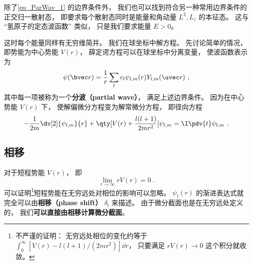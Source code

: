 除了\autoref{eq_ParWav_1} 的边界条件外， 我们也可以找到符合另一种常用边界条件的正交归一散射态， 即要求每个散射态同时是能量和角动量 $L^2, L_z$ 的本征态。 这与 “氢原子的定态波函数” 类似， 只是我们要求能量 $E > 0$。

这时每个能量同样有无穷维简并。 我们在球坐标中解方程。 先讨论简单的情况， 即势能为中心势能 $V(r)$， 薛定谔方程可以在球坐标中分离变量， 使波函数表示为 %
\begin{equation}
\psi(\bvec r) = \frac{1}{r} \sum_l c_l \psi_{l,m}(r) Y_{l,m}(\uvec r)~,
\end{equation}
其中每一项被称为一个\textbf{分波（partial wave）}， 满足上述边界条件。 因为在中心势能 $V(r)$ 下， 使解偏微分方程变为解常微分方程， 即径向方程 %
\begin{equation}
-\frac{1}{2m} \dv[2]{\psi_{l,m}}{r} + \qty[V(r) + \frac{l(l + 1)}{2mr^2}]\psi_{l,m} = \I \pdv{t} \psi_{l,m}~.
\end{equation}

\subsection{相移}
对于短程势能 $V(r)$， 即
\begin{equation}
\lim_{r\to\infty} r V(r) = 0~.
\end{equation}
可以证明\footnote{不严谨的证明： 无穷远处相位的变化约等于 $\int_0^\infty [V(r) - l(l+1)/(2mr^2)]\dd{r}$， 只要满足 $rV(r) \to 0$ 这个积分就收敛。}短程势能在无穷远处对相位的影响可以忽略。 $\psi_l(r)$ 的渐进表达式就完全可以由\textbf{相移（phase shift）} $\delta_l$ 来描述。 由于微分截面也是在无穷远处定义的， 我们\textbf{可以直接由相移计算微分截面}。

